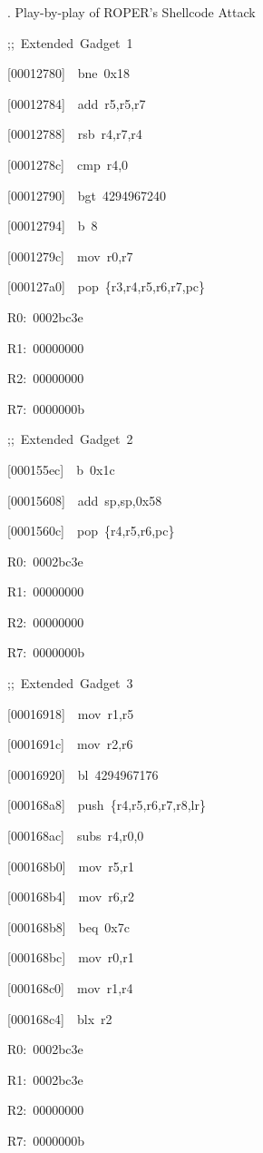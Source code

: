\documentclass[9pt]{beamer}
\newcommand{\Gap} { \\ \pause \vspace{8pt} }
\begin{document}
\begin{frame}{\theframenumber. Play-by-play of ROPER's Shellcode Attack}
  \begin{multicols}{3}
  \tiny
  {\color{title};;~Extended~Gadget~1}
  
  [00012780]~~bne~0x18
  
  [00012784]~~add~r5,r5,r7

  [00012788]~~rsb~r4,r7,r4

  [0001278c]~~cmp~r4,0
  
  [00012790]~~bgt~4294967240
  
  [00012794]~~b~8
  
  [0001279c]~~mov~r0,r7
  
  [000127a0]~~pop~\{r3,r4,r5,r6,r7,pc\}
  \vspace{4pt}


  R0:~0002bc3e

  R1:~00000000
  
  R2:~00000000
  
  R7:~0000000b
  \Gap

  \columnbreak
  {\color{title};;~Extended~Gadget~2}
  
  [000155ec]~~b~0x1c

  [00015608]~~add~sp,sp,0x58

  [0001560c]~~pop~\{r4,r5,r6,pc\}
  \vspace{4pt}
  
  R0:~0002bc3e
  
  R1:~00000000
  
  R2:~00000000
  
  R7:~0000000b
  \Gap
\columnbreak

{\color{title};;~Extended~Gadget~3}
  
\alert<@+|+->{[00016918]~~mov~r1,r5}

[0001691c]~~mov~r2,r6

[00016920]~~bl~4294967176

[000168a8]~~push~\{r4,r5,r6,r7,r8,lr\}

[000168ac]~~subs~r4,r0,0

[000168b0]~~mov~r5,r1

[000168b4]~~mov~r6,r2

[000168b8]~~beq~0x7c

[000168bc]~~mov~r0,r1

[000168c0]~~mov~r1,r4

\alert<@+|+->{[000168c4]~~blx~r2}
\vspace{4pt}


R0:~0002bc3e

R1:~0002bc3e

R2:~00000000

R7:~0000000b

\end{multicols}
\end{frame}
\end{document}
